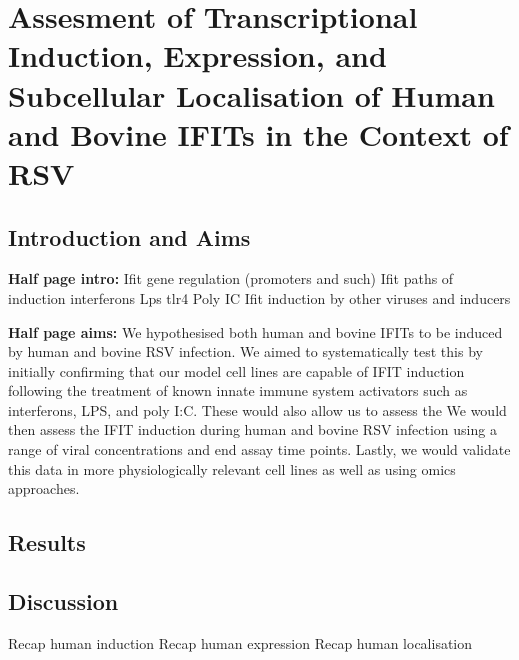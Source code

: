 \chapter{Assesment of Transcriptional Induction, Expression, and Subcellular Localisation of Human and Bovine IFITs in the Context of RSV} \label{Assesment of Transcriptional Induction, Expression, and Subcellular Localisation of Human IFITs in the Context of RSV}
\section{Introduction and Aims} \label{Introduction and Aims}
\textbf{Half page intro:}
Ifit gene regulation (promoters and such) \newline
Ifit paths of induction \newline
interferons \newline
Lps tlr4 \newline
Poly IC \newline
Ifit induction by other viruses and inducers \newline


\textbf{Half page aims:}
We hypothesised both human and bovine IFITs to be induced by human and bovine RSV infection. We aimed to systematically test this by initially confirming that our model cell lines are capable of IFIT induction following the treatment of known innate immune system activators such as interferons, LPS, and poly I:C. These would also allow us to assess the  We would then assess the IFIT induction during human and bovine RSV infection using a range of viral concentrations and end assay time points. Lastly, we would validate this data in more physiologically relevant cell lines as well as using omics approaches.

\section{Results} \label{Results}





\section{Discussion} \label{Discussion}
Recap human induction \newline
Recap human expression \newline
Recap human localisation




